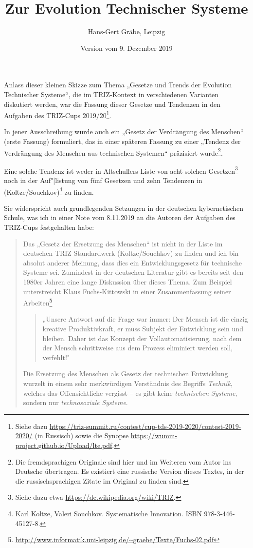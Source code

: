 \documentclass[11pt,a4paper]{article}
\title{Zur Evolution Technischer Systeme}
\author{Hans-Gert Gräbe, Leipzig}
\date{Version vom 9. Dezember 2019}
\begin{document}
\maketitle

Anlass dieser kleinen Skizze zum Thema „Gesetze und Trends der Evolution
Technischer Systeme“, die im TRIZ-Kontext in verschiedenen Varianten
diskutiert werden, war die Fassung dieser Gesetze und Tendenzen in den
Aufgaben des TRIZ-Cups 2019/20\footnote{Siehe dazu
  \url{https://triz-summit.ru/contest/cup-tds-2019-2020/contest-2019-2020/}
  (in Russisch) sowie die Synopse
  \url{https://wumm-project.github.io/Upload/lte.pdf}. }.

In jener Ausschreibung wurde auch ein „Gesetz der Verdrängung des Menschen“
(erste Fassung) formuliert, das in einer späteren Fassung zu einer „Tendenz
der Verdrängung des Menschen aus technischen Systemen“ präzisiert
wurde\footnote{Die fremdsprachigen Originale sind hier und im Weiteren vom
  Autor ins Deutsche übertragen. Es existiert eine russische Version dieses
  Textes, in der die russischsprachigen Zitate im Original zu finden sind.}.

Eine solche Tendenz ist weder in Altschullers Liste von acht solchen
Gesetzen\footnote{Siehe dazu etwa \url{https://de.wikipedia.org/wiki/TRIZ}.}
noch in der Auf"|listung von fünf Gesetzen und zehn Tendenzen in
(Koltze/Souchkov)\footnote{Karl Koltze, Valeri Souchkov. Systematische
  Innovation. ISBN 978-3-446-45127-8.} zu finden.

Sie widerspricht auch grundlegenden Setzungen in der deutschen kybernetischen
Schule, was ich in einer Note vom 8.11.2019 an die Autoren der Aufgaben des
TRIZ-Cups festgehalten habe:
\begin{quote}
  Das „Gesetz der Ersetzung des Menschen“ ist nicht in der Liste im deutschen
  TRIZ-Standardwerk (Koltze/Souchkov) zu finden und ich bin absolut anderer
  Meinung, dass dies ein Entwicklungsgesetz für technische Systeme sei.
  Zumindest in der deutschen Literatur gibt es bereits seit den 1980er Jahren
  eine lange Diskussion über dieses Thema. Zum Beispiel unterstreicht Klaus
  Fuchs-Kittowski in einer Zusammenfassung seiner
  Arbeiten\footnote{\url{http://www.informatik.uni-leipzig.de/~graebe/Texte/Fuchs-02.pdf}}
  \begin{quote}
    „Unsere Antwort auf die Frage war immer: Der Mensch ist die einzig kreative
    Produktivkraft, er muss Subjekt der Entwicklung sein und bleiben.  Daher
    ist das Konzept der Vollautomatisierung, nach dem der Mensch schrittweise
    aus dem Prozess eliminiert werden soll, verfehlt!"
  \end{quote}
  Die Ersetzung des Menschen als Gesetz der technischen Entwicklung wurzelt in
  einem sehr merkwürdigen Verständnis des Begriffs \emph{Technik}, welches das
  Offensichtliche vergisst -- es gibt keine \emph{technischen Systeme},
  sondern nur \emph{technosoziale Systeme}.
\end{quote}
\end{document}
